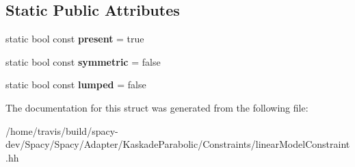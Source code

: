 \subsection*{Static Public Attributes}
\begin{DoxyCompactItemize}
\item 
\hypertarget{structKaskade_1_1LinearModelPDE_1_1D2_a4809ae0ff21ab66021bb50f1086d85f8}{static bool const {\bfseries present} = true}\label{structKaskade_1_1LinearModelPDE_1_1D2_a4809ae0ff21ab66021bb50f1086d85f8}

\item 
\hypertarget{structKaskade_1_1LinearModelPDE_1_1D2_aa76749f3dca9de286fd8ec5ad191aea1}{static bool const {\bfseries symmetric} = false}\label{structKaskade_1_1LinearModelPDE_1_1D2_aa76749f3dca9de286fd8ec5ad191aea1}

\item 
\hypertarget{structKaskade_1_1LinearModelPDE_1_1D2_acc0c871f4b945a91a0855e6bfba40d32}{static bool const {\bfseries lumped} = false}\label{structKaskade_1_1LinearModelPDE_1_1D2_acc0c871f4b945a91a0855e6bfba40d32}

\end{DoxyCompactItemize}


The documentation for this struct was generated from the following file\-:\begin{DoxyCompactItemize}
\item 
/home/travis/build/spacy-\/dev/\-Spacy/\-Spacy/\-Adapter/\-Kaskade\-Parabolic/\-Constraints/linear\-Model\-Constraint.\-hh\end{DoxyCompactItemize}
